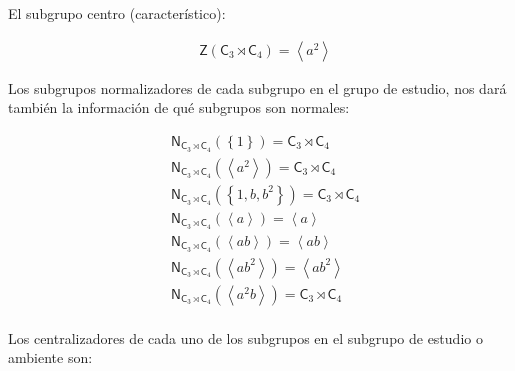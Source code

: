 \documentclass[12pt,a4paper,fleqn,spanish,final,openright]{extbook}
\theoremstyle{definition}
\theoremstyle{remark}
\begin{document}
El subgrupo centro (característico):

\begin{align*}
&\mathsf{Z}\left({{{\mathsf{C}}_{3}}\rtimes{{\mathsf{C}}_{4}}}\right) 
= {\left\langle{a^2}\right\rangle}
\end{align*}

Los subgrupos normalizadores de cada subgrupo en el grupo de estudio, 
nos dará también la información de qué subgrupos son normales:

\begin{align*}
&{\mathsf{N}}_{{{\mathsf{C}}_{3}}\rtimes{{\mathsf{C}}_{4}}}
\left({\left\lbrace{1}\right\rbrace}\right) = 
{{{\mathsf{C}}_{3}}\rtimes{{\mathsf{C}}_{4}}}\\
&{\mathsf{N}}_{{{\mathsf{C}}_{3}}\rtimes{{\mathsf{C}}_{4}}}
\left({\left\langle{a^2}\right\rangle}\right) = 
{{{\mathsf{C}}_{3}}\rtimes{{\mathsf{C}}_{4}}}\\
&{\mathsf{N}}_{{{\mathsf{C}}_{3}}\rtimes{{\mathsf{C}}_{4}}}
\left({\left\lbrace{1,b,b^2}\right\rbrace}\right) = 
{{{\mathsf{C}}_{3}}\rtimes{{\mathsf{C}}_{4}}}\\
&{\mathsf{N}}_{{{\mathsf{C}}_{3}}\rtimes{{\mathsf{C}}_{4}}}
\left({\left\langle{a}\right\rangle}\right) = 
{\left\langle{a}\right\rangle}\\
&{\mathsf{N}}_{{{\mathsf{C}}_{3}}\rtimes{{\mathsf{C}}_{4}}}
\left({\left\langle{ab}\right\rangle}\right) = 
{\left\langle{ab}\right\rangle}\\
&{\mathsf{N}}_{{{\mathsf{C}}_{3}}\rtimes{{\mathsf{C}}_{4}}}
\left({\left\langle{ab^2}\right\rangle}\right) = 
{\left\langle{ab^2}\right\rangle}\\
&{\mathsf{N}}_{{{\mathsf{C}}_{3}}\rtimes{{\mathsf{C}}_{4}}}
\left({\left\langle{a^2b}\right\rangle}\right) = 
{{{\mathsf{C}}_{3}}\rtimes{{\mathsf{C}}_{4}}}\\
\end{align*}

Los centralizadores de cada uno de los subgrupos en el subgrupo de estudio o ambiente son:
\end{document}
